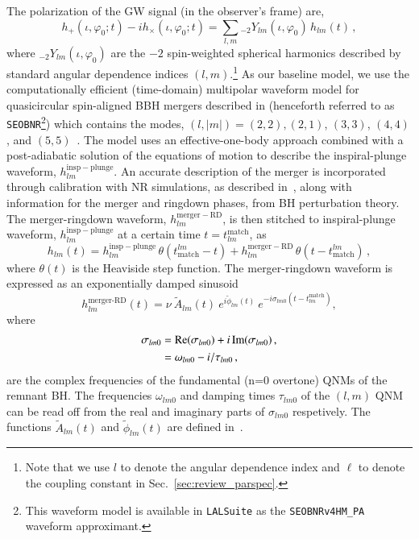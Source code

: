 \documentclass[twocolumn,prd,aps,superscriptaddress,preprintnumbers,tightenlines,showpacs,nofootinbib,amsfonts,amsmath,longbibliography]{revtex4-1}
\newcommand{\SEOB}{\texttt{SEOBNR}}
\begin{document}
The polarization of the GW signal (in the observer's frame) are,
%
\begin{equation}
h_+(\iota,\varphi_0;t ) - i h_\times(\iota,\varphi_0;t) = \sum_{l, m} {}_{-\!2}Y_{l m}(\iota,\varphi_0)\, h_{l m}(t)\,,
\end{equation}
%
where ${}_{-\!2}Y_{l m}(\iota,\varphi_0)$ are the $-2$ spin-weighted spherical harmonics described by standard angular dependence indices $(l,m)$.\footnote{Note that we use $l$ to denote the angular dependence index and $\ell$ to denote the coupling constant in Sec.~\ref{sec:review_parspec}.} As our baseline model, we use the computationally efficient (time-domain) multipolar waveform model for quasicircular spin-aligned BBH mergers described in \cite{Mihaylov:2021bpf} (henceforth referred to as \SEOB{}\footnote{This waveform model is available in \texttt{LALSuite} \cite{lalsuite} as the \texttt{SEOBNRv4HM\_PA} waveform approximant.}) which contains the modes, $(l, |m|)=(2,2),(2,1)$, $(3,3)$, $(4,4)$, and $(5,5)$~\cite{Cotesta:2018fcv,Mihaylov:2021bpf}. The model uses an effective-one-body approach combined with a post-adiabatic solution of the equations of motion to describe the inspiral-plunge waveform, $h_{l m}^\mathrm{insp-plunge}$. An accurate description of the merger is incorporated through calibration with NR simulations, as described in~\cite{Cotesta:2018fcv}, along with information for the merger and ringdown phases, from BH perturbation theory. The merger-ringdown waveform, $h_{l m}^\mathrm{merger-RD}$, is then stitched to inspiral-plunge waveform, $h_{l m}^\mathrm{insp-plunge}$ at a certain time $t = t^{\textrm{match}}_{l m}$, as
%
\begin{equation}
h_{l m}(t) = h_{l m}^\mathrm{insp-plunge}\, \theta(t_\mathrm{match}^{l m} - t) + h_{l m}^\mathrm{merger-RD}\,\theta(t-t_\mathrm{match}^{l m})\,,
\end{equation}
%
where $\theta(t)$ is the Heaviside step function. The merger-ringdown waveform is expressed as an exponentially damped sinusoid ~\citep{Bohe:2016gbl,Cotesta:2018fcv,Mihaylov:2021bpf}
%
\begin{equation}
\label{RD}
h_{l m}^{\textrm{merger-RD}}(t) = \nu \ \tilde{A}_{l m}(t)\ e^{i \tilde{\phi}_{l m}(t)} \ e^{-i \sigma_{l m 0}(t-t^{\textrm{match}}_{l m})},
\end{equation}
%
where
%
\begin{align}
\sigma_{l m 0} &= {\rm Re}(\sigma_{l m 0}) + i \, {\rm Im}(\sigma_{l m 0})\,,
\nonumber \\
&= \omega_{l m 0} - i / \tau_{l m 0}\,,
\end{align}
%
are the complex frequencies of the fundamental (n=0 overtone) QNMs of the remnant BH. The frequencies $\omega_{l m 0}$ and damping times $\tau_{l m 0}$ of the $(l, m)$ QNM can be read off from the real and imaginary parts of  $\sigma_{l m0}$ respetively. The functions $\tilde{A}_{l m}(t)$ and $\tilde{\phi}_{l m}(t)$ are defined in~\cite{Bohe:2016gbl,Cotesta:2018fcv}.
\end{document}
